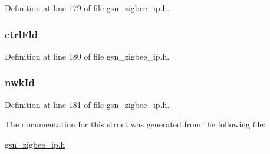 Definition at line 179 of file gsn\_\-zigbee\_\-ip.h.

\hypertarget{a00442_afb4fb7889abfa7565fb5948cdd79a786}{
\subsubsection[{ctrlFld}]{ {\bf ctrlFld}}}
\label{a00442_afb4fb7889abfa7565fb5948cdd79a786}


Definition at line 180 of file gsn\_\-zigbee\_\-ip.h.

\hypertarget{a00442_aa09adf9d6455e0d08084e30083a043cd}{
\subsubsection[{nwkId}]{ {\bf nwkId}}}
\label{a00442_aa09adf9d6455e0d08084e30083a043cd}


Definition at line 181 of file gsn\_\-zigbee\_\-ip.h.



The documentation for this struct was generated from the following file:\begin{DoxyCompactItemize}
\item 
\hyperlink{a00618}{gsn\_\-zigbee\_\-ip.h}\end{DoxyCompactItemize}
